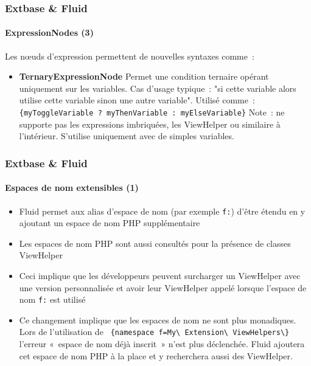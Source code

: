 \begin{frame}[fragile]
	\frametitle{Extbase \& Fluid}
	\framesubtitle{ExpressionNodes (3)}

	Les nœuds d'expression permettent de nouvelles syntaxes comme~:

	\begin{itemize}

		\item \textbf{TernaryExpressionNode}\newline
			\small
				Permet une condition ternaire opérant uniquement sur les variables.
				Cas d'usage typique~: "si cette variable alors utilise cette variable
				sinon une autre variable". Utilisé comme~:\newline
				\texttt{\{myToggleVariable ? myThenVariable : myElseVariable\}}\newline
				Note~: ne supporte pas les expressions imbriquées, les ViewHelper ou similaire
				à l'intérieur. S'utilise uniquement avec de simples variables.
			\normalsize

	\end{itemize}

\end{frame}


\begin{frame}[fragile]
	\frametitle{Extbase \& Fluid}
	\framesubtitle{Espaces de nom extensibles (1)}

	\begin{itemize}

		\item Fluid permet aux alias d'espace de nom (par exemple \texttt{f:})
			d'être étendu en y ajoutant un espace de nom PHP supplémentaire

		\item Les espaces de nom PHP sont aussi consultés pour la présence de classes
			ViewHelper

		\item Ceci implique que les développeurs peuvent surcharger un ViewHelper avec
			une version personnalisée et avoir leur ViewHelper appelé lorsque l'espace
			de nom \texttt{f:} est utilisé

		\item Ce changement implique que les espaces de nom ne sont plus monadiques.
			Lors de l'utilisation de\newline
			\texttt{
				\{namespace f=My\textbackslash
				Extension\textbackslash
				ViewHelpers\textbackslash\}}
				l'erreur «~espace de nom déjà inscrit~» n'est plus déclenchée.
				Fluid ajoutera cet espace de nom PHP à la place et y recherchera
				aussi des ViewHelper.

	\end{itemize}

\end{frame}

